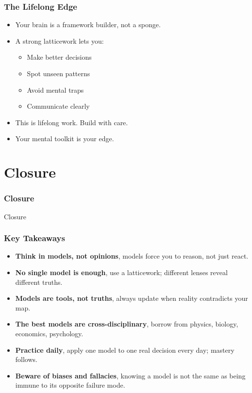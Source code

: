 \begin{frame}[fragile]\frametitle{The Lifelong Edge}
  \begin{itemize}
    \item Your brain is a framework builder, not a sponge.
    \item A strong latticework lets you:
      \begin{itemize}
        \item Make better decisions
        \item Spot unseen patterns
        \item Avoid mental traps
        \item Communicate clearly
      \end{itemize}
    \item This is lifelong work. Build with care.
    \item Your mental toolkit is your edge.
  \end{itemize}
\end{frame}


\section{Closure}

\begin{frame}[fragile]\frametitle{Closure}
\begin{center}
{\Large Closure}
\end{center}
\end{frame}

\begin{frame}[fragile]\frametitle{Key Takeaways}
  \begin{itemize}
    \item \textbf{Think in models, not opinions},  models force you to reason, not just react.
    \item \textbf{No single model is enough},  use a latticework; different lenses reveal different truths.
    \item \textbf{Models are tools, not truths},  always update when reality contradicts your map.
    \item \textbf{The best models are cross-disciplinary},  borrow from physics, biology, economics, psychology.
    \item \textbf{Practice daily},  apply one model to one real decision every day; mastery follows.
    \item \textbf{Beware of biases and fallacies},  knowing a model is not the same as being immune to its opposite failure mode.
  \end{itemize}
\end{frame}

